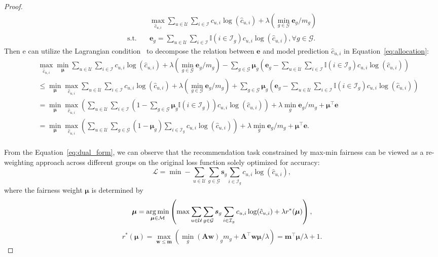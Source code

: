 \begin{proof}
    
    \begin{equation}\label{eq:allocation}
        \begin{aligned}
            \quad& \max_{\hat{c}_{u,i}} \sum_{u\in\mathcal{U}}\sum_{i\in \mathcal{I}}c_{u,i}\log(\hat{c}_{u,i}) + \lambda (\min_{g\in\mathcal{G}} \bm{e}_g/m_g) \\
            \textrm{s.t.}\quad & \bm{e}_g = \sum_{u\in\mathcal{U}}\sum_{i\in \mathcal{I}} \mathbb{I}(i\in\mathcal{I}_g)c_{u,i}\log(\hat{c}_{u,i}), \forall g\in\mathcal{G}.
        \end{aligned}
    \end{equation}
    Then e can utilize the Lagrangian condition~\citep{balseiro2021regularized} to decompose the relation between $\bm{e}$ and model prediction $\hat{c}_{u,i}$ in Equation~\eqref{eq:allocation}:
    \begin{equation}\label{eq:dual_form}
        \begin{aligned}
        \quad& \max_{\hat{c}_{u,i}} \min_{\bm{\mu}} \sum_{u\in\mathcal{U}}\sum_{i\in \mathcal{I}}c_{u,i}\log(\hat{c}_{u,i}) + \lambda (\min_{g\in\mathcal{G}} \bm{e}_g/m_g) - \sum_{g\in\mathcal{G}}\bm{\mu}_g\left(\bm{e}_g-\sum_{u\in\mathcal{U}}\sum_{i\in \mathcal{I}} \mathbb{I}(i\in\mathcal{I}_g)c_{u,i}\log(\hat{c}_{u,i})\right)\\
        &\leq \min_{\bm{\mu}} \max_{\hat{c}_{u,i}} \sum_{u\in\mathcal{U}}\sum_{i\in \mathcal{I}}c_{u,i}\log(\hat{c}_{u,i}) + \lambda (\min_{g\in\mathcal{G}} \bm{e}_g/m_g) + \sum_{g\in\mathcal{G}}\bm{\mu}_g\left(\bm{e}_g-\sum_{u\in\mathcal{U}}\sum_{i\in \mathcal{I}} \mathbb{I}(i\in\mathcal{I}_g)c_{u,i}\log(\hat{c}_{u,i})\right)\\
        &= \min_{\bm{\mu}} \max_{\hat{c}_{u,i}}  \left(\sum_{u\in\mathcal{U}}\sum_{i\in \mathcal{I}} (1-\sum_{g\in\mathcal{G}}\bm{\mu}_g\mathbb{I}(i\in\mathcal{I}_g))c_{u,i}\log(\hat{c}_{u,i})\right) + \lambda \min_g \bm{e}_g/m_g + \bm{\mu}^{\top}\bm{e}\\
        &= \min_{\bm{\mu}} \max_{\hat{c}_{u,i}}  \left(\sum_{u\in\mathcal{U}}\sum_{g\in\mathcal{G}}(1-\bm{\mu}_g)\sum_{i\in\mathcal{I}_g}c_{u,i}\log(\hat{c}_{u,i})\right) + \lambda \min_g \bm{e}_g/m_g + \bm{\mu}^{\top}\bm{e}.\\
        \end{aligned}
    \end{equation}

    From the Equation~\eqref{eq:dual_form}, we can observe that the recommendation task constrained by max-min fairness can be viewed as a re-weighting approach across different groups on the original loss function solely optimized for accuracy:
    \[
        \mathcal{L} = \min -\sum_{u\in\mathcal{U}}\sum_{g\in\mathcal{G}}\bm{s}_g\sum_{i\in\mathcal{I}_g}c_{u,i}\log(\hat{c}_{u,i}),
    \]
    where the fairness weight $\bm{\mu}$ is determined by 
     \[
    \bm{\mu} =  \operatorname*{arg\,min}_{\bm{\mu}\in\mathcal{M}} \left(\max \sum_{u\in\mathcal{U}}\sum_{g\in\mathcal{G}}\bm{s}_g\sum_{i\in\mathcal{I}_g}c_{u,i}\log(\hat{c}_{u,i}) + \lambda r^*(\bm{\mu})\right),
    \]
    \[
    r^*(\bm{\mu}) = \max_{\bm{w}\leq \bm{m}} \left(\min_g (\bm{A}\bm{w})_gm_g+\bm{A}^{\top}\bm{w}\bm{\mu}/\lambda\right)=\bm{m}^{\top}\bm{\mu}/\lambda+1.
    \]


\end{proof}
